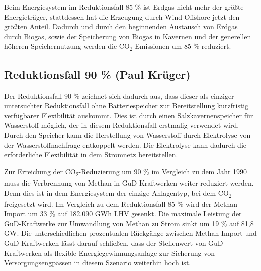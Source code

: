 Beim Energiesystem im Reduktionsfall 85 \% ist Erdgas nicht mehr der größte Energieträger, stattdessen hat die Erzeugung durch Wind Offshore jetzt den größten Anteil.
Dadurch und durch den beginnenden Austausch von Erdgas durch Biogas, sowie der Speicherung von Biogas in Kavernen und der generellen höheren Speichernutzung werden die CO\textsubscript{2}-Emissionen um 85 \% reduziert.

\newpage
\subsection{Reduktionsfall 90 \% (Paul Krüger)}
Der Reduktionsfall 90 \% zeichnet sich dadurch aus, dass dieser als einziger untersuchter Reduktionsfall ohne Batteriespeicher zur Bereitstellung kurzfristig verfüg\-barer Flexibilität auskommt. Dies ist durch einen Salzkavernenspeicher für Wasserstoff möglich, der in diesem Reduktionsfall erstmalig verwendet wird. Durch den Speicher kann die Herstellung von Wasserstoff durch Elektrolyse von der Wasserstoffnachfrage entkoppelt werden. Die Elektrolyse kann dadurch die erforderliche Flexibilität in dem Stromnetz bereitstellen.

Zur Erreichung der CO\textsubscript{2}-Reduzierung um 90 \% im Vergleich zu dem Jahr 1990 muss die Verbrennung von Methan in GuD-Kraftwerken weiter reduziert werden. Denn dies ist in dem Energiesystem der einzige Anlagentyp, bei dem CO\textsubscript{2} freigesetzt wird. Im Vergleich zu dem Reduktionsfall 85 \% wird der Methan Import um 33 \% auf 182.090 GWh LHV gesenkt. Die maximale Leistung der GuD-Kraftwerke zur Umwandlung von Methan zu Strom sinkt um 19 \% auf 81,8 GW. Die unterschiedlichen prozentualen Rückgänge zwischen Methan Import und GuD-Kraftwerken lässt darauf schließen, dass der Stellenwert von GuD-Kraftwerken als flexible Energiegewinnungsanlage zur Sicherung von Versorgungsengpässen in diesem Szenario weiterhin hoch ist.

